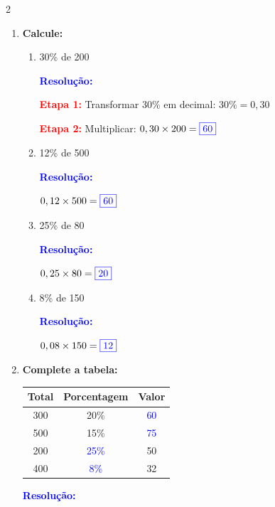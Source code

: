 \documentclass[11pt]{article}
\newcommand{\respostaNum}[1]{\textcolor{blue}{\boxed{#1}}}
\newcommand{\resolucao}{\textbf{\textcolor{blue}{Resolução:}}}
\begin{document}
\begin{multicols}{2}
\begin{enumerate}[leftmargin=*]
\begin{enumerate}[label=\alph*)]
\item 1,5

\resolucao
\[
1,5 = \frac{150}{100} = \respostaNum{150\%}
\]

\item 0,02

\resolucao
\[
0,02 = \frac{2}{100} = \respostaNum{2\%}
\]
\end{enumerate}

\item \textbf{Calcule:}

\begin{enumerate}[label=\alph*)]
\item 30\% de 200

\resolucao

\textbf{\textcolor{red}{Etapa 1:}} Transformar 30\% em decimal: $30\% = 0,30$

\textbf{\textcolor{red}{Etapa 2:}} Multiplicar: $0,30 \times 200 = \respostaNum{60}$

\item 12\% de 500

\resolucao

$0,12 \times 500 = \respostaNum{60}$

\item 25\% de 80

\resolucao

$0,25 \times 80 = \respostaNum{20}$

\item 8\% de 150

\resolucao

$0,08 \times 150 = \respostaNum{12}$
\end{enumerate}

\item \textbf{Complete a tabela:}

\begin{center}
\begin{tabular}{|c|c|c|}
\hline
\textbf{Total} & \textbf{Porcentagem} & \textbf{Valor} \\
\hline
300 & 20\% & \textcolor{blue}{60} \\
500 & 15\% & \textcolor{blue}{75} \\
200 & \textcolor{blue}{25\%} & 50 \\
400 & \textcolor{blue}{8\%} & 32 \\
\hline
\end{tabular}
\end{center}

\resolucao


\end{enumerate}
\end{multicols}
\end{document}
